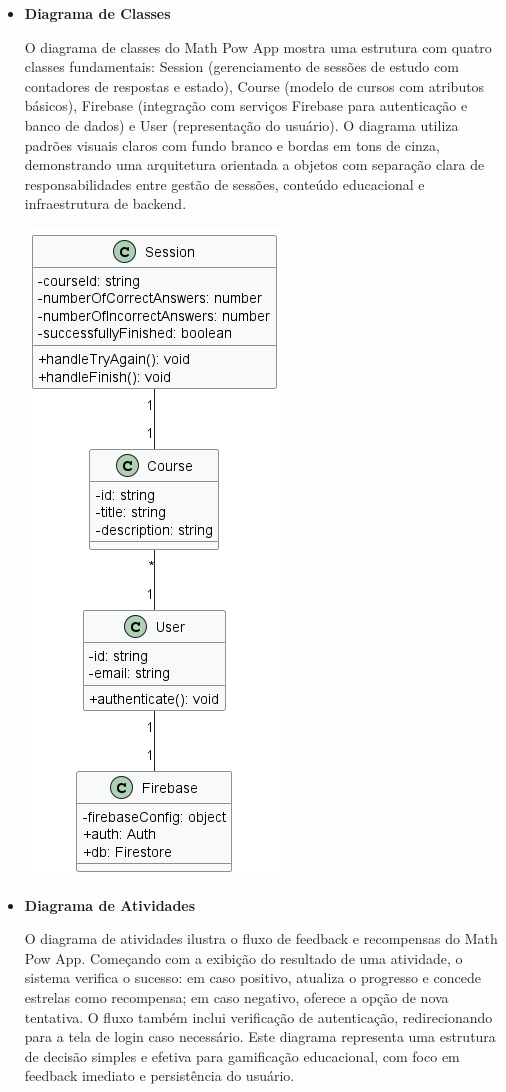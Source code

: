 \begin{itemize}
\item \textbf{Diagrama de Classes}

O diagrama de classes do Math Pow App mostra uma estrutura com quatro classes fundamentais: Session (gerenciamento de sessões de estudo com contadores de respostas e estado), Course (modelo de cursos com atributos básicos), Firebase (integração com serviços Firebase para autenticação e banco de dados) e User (representação do usuário). O diagrama utiliza padrões visuais claros com fundo branco e bordas em tons de cinza, demonstrando uma arquitetura orientada a objetos com separação clara de responsabilidades entre gestão de sessões, conteúdo educacional e infraestrutura de backend.

\begin{center}
\includegraphics[width=0.3\linewidth]{figuras/DiagramsUMLs/Math Pow App.png}
\label{fig:diagrama-de-classes}
\end{center}

\item \textbf{Diagrama de Atividades}

O diagrama de atividades ilustra o fluxo de feedback e recompensas do Math Pow App. Começando com a exibição do resultado de uma atividade, o sistema verifica o sucesso: em caso positivo, atualiza o progresso e concede estrelas como recompensa; em caso negativo, oferece a opção de nova tentativa. O fluxo também inclui verificação de autenticação, redirecionando para a tela de login caso necessário. Este diagrama representa uma estrutura de decisão simples e efetiva para gamificação educacional, com foco em feedback imediato e persistência do usuário.


\end{itemize}
